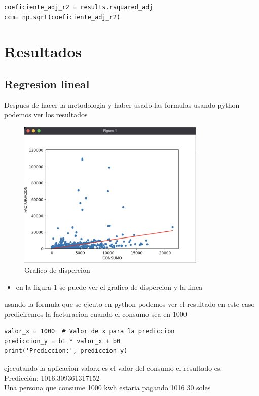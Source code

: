 \documentclass{article}
\begin{document}
\begin{lstlisting}
coeficiente_adj_r2 = results.rsquared_adj
ccm= np.sqrt(coeficiente_adj_r2)
\end{lstlisting}

\section{Resultados}
\subsection{Regresion lineal}
Despues de hacer la metodologia y haber usado las formulas usando python podemos ver los resultados 

\begin{figure}[H]
  \centering
  \includegraphics[width=0.8\textwidth]{./img/regrelin.png}
  \caption{Grafico de dispercion}
  \label{Grafico de dispercion}
\end{figure}
\begin{itemize}
  \item en la figura 1 se puede ver el grafico de dispercion y la linea 
\end{itemize}
usando la formula que se ejcuto en python podemos ver el resultado en este caso prediciremos la facturacion cuando el consumo sea en 1000
\\
\begin{lstlisting}
valor_x = 1000  # Valor de x para la prediccion
prediccion_y = b1 * valor_x + b0
print('Prediccion:', prediccion_y)
\end{lstlisting}
ejecutando la aplicacion valor\textunderscore x es el valor del consumo el resultado es.
\\
Predicción: 1016.309361317152
\\
Una persona que consume 1000 kwh estaria pagando 1016.30 soles
\end{document}
